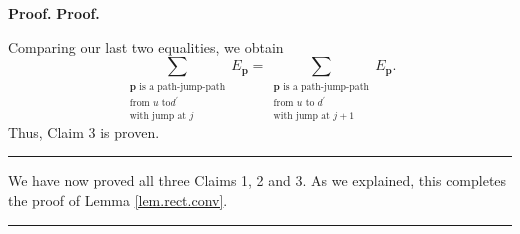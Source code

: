 \documentclass[numbers=enddot,12pt,final,onecolumn,notitlepage]{scrartcl}%
\theoremstyle{definition}
\newenvironment{verlong}{}{}
\newenvironment{proof}[1][Proof]{\noindent\textbf{#1.} }{\ \rule{0.5em}{0.5em}}
\let\sumnonlimits\sum
\renewcommand{\sum}{\sumnonlimits\limits}
\begin{document}
\begin{proof}
\begin{proof}
\begin{verlong}
\end{verlong}

Comparing our last two equalities, we obtain%
\[
\sum_{\substack{\mathbf{p}\text{ is a path-jump-path}\\\text{from }u\text{ to
}d^{\prime}\\\text{with jump at }j}}E_{\mathbf{p}}=\sum_{\substack{\mathbf{p}%
\text{ is a path-jump-path}\\\text{from }u\text{ to }d^{\prime}\\\text{with
jump at }j+1}}E_{\mathbf{p}}.
\]
Thus, Claim 3 is proven.
\end{proof}

We have now proved all three Claims 1, 2 and 3. As we explained, this
completes the proof of Lemma \ref{lem.rect.conv}.
\end{proof}
\end{document}
